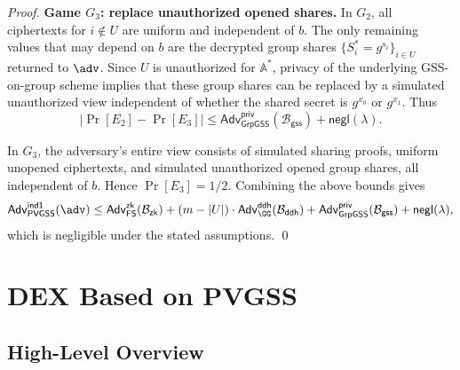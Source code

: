 \documentclass[runningheads]{llncs}
\begin{document}
\begin{proof}
\textbf{Game \(G_3\): replace unauthorized opened shares.} In \(G_2\), all ciphertexts for \(i\notin U\) are uniform and independent of \(b\). The only remaining values that may depend on \(b\) are the decrypted group shares \(\{S_i^*=g^{s_i}\}_{i\in U}\) returned to \(\adv\). Since \(U\) is unauthorized for \(\mathbb{A}^*\), privacy of the underlying GSS-on-group scheme implies that these group shares can be replaced by a simulated unauthorized view independent of whether the shared secret is \(g^{x_0}\) or \(g^{x_1}\). Thus
\[
\left|\Pr[E_2]-\Pr[E_3]\right|
\leq
\mathsf{Adv}^{\mathsf{priv}}_{\mathsf{GrpGSS}}(\mathcal{B}_{\mathsf{gss}})
+\mathsf{negl}(\lambda).
\]

In \(G_3\), the adversary's entire view consists of simulated sharing proofs, uniform unopened ciphertexts, and simulated unauthorized opened group shares, all independent of \(b\). Hence \(\Pr[E_3]=1/2\). Combining the above bounds gives
\[
\mathsf{Adv}^{\mathsf{ind1}}_{\mathsf{PVGSS}}(\adv)
\leq
\mathsf{Adv}^{\mathsf{zk}}_{\mathsf{FS}}(\mathcal{B}_{\mathsf{zk}})
+(m-|U|)\cdot \mathsf{Adv}^{\mathsf{ddh}}_{\GG}(\mathcal{B}_{\mathsf{ddh}})
+\mathsf{Adv}^{\mathsf{priv}}_{\mathsf{GrpGSS}}(\mathcal{B}_{\mathsf{gss}})
+\mathsf{negl}(\lambda),
\]
which is negligible under the stated assumptions.
\qed
\end{proof}



\section{DEX Based on PVGSS}
\label{sec:dex_on_pvgss}






\subsection{High-Level Overview}
\end{document}
